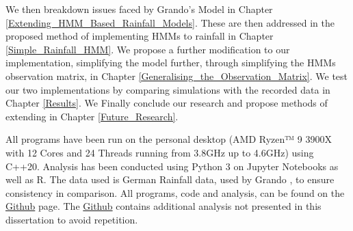 We then breakdown issues faced by Grando's Model in Chapter \ref{Extending_HMM_Based_Rainfall_Models}. These are then addressed in the proposed method of implementing HMMs to rainfall in Chapter \ref{Simple_Rainfall_HMM}. We propose a further modification to our implementation, simplifying the model further, through simplifying the HMMs observation matrix,  in Chapter \ref{Generalising_the_Observation_Matrix}. We test our two implementations by comparing simulations with the recorded data in Chapter \ref{Results}. We Finally conclude our research and propose methods of extending in Chapter \ref{Future_Research}.


All programs have been run on the personal desktop (AMD Ryzen™ 9 3900X with 12 Cores and 24 Threads running from 3.8GHz up to 4.6GHz) using C++20. Analysis has been conducted using Python 3 on Jupyter Notebooks as well as R. The data used is German Rainfall data, used by Grando \cite{Grando2019}, to ensure consistency in comparison. All programs, code and analysis, can be found on the \href{https://github.com/djagpal02/HiddenMarkovModels_RainGenerators }{Github} page. The \href{https://github.com/djagpal02/HiddenMarkovModels_RainGenerators }{Github} contains additional analysis not presented in this dissertation to avoid repetition. 

